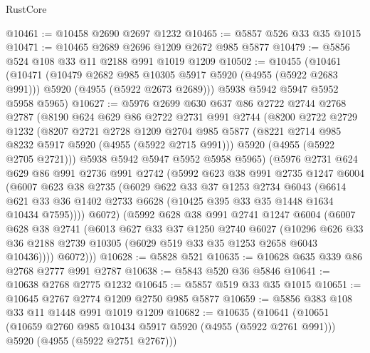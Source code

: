 \begin{lexlean}{RustCore}
\begin{coremodule}
@10461 := @10458 @2690 @2697 @1232
@10465 := @5857 @526 @33 @35 @1015
@10471 := @10465 @2689 @2696 @1209 @2672 @985 @5877
@10479 := @5856 @524 @108 @33 @11 @2188 @991 @1019 @1209
@10502 := @10455
    (@10461
      (@10471
        (@10479 @2682 @985 @10305 @5917 @5920 (@4955 (@5922 @2683 @991)))
        @5920
        (@4955 (@5922 @2673 @2689)))
      @5938
      @5942
      @5947
      @5952
      @5958
      @5965)
@10627 := @5976
    @2699
    @630
    @637
    @86
    @2722
    @2744
    @2768
    @2787
    (@8190
      @624
      @629
      @86
      @2722
      @2731
      @991
      @2744
      (@8200
        @2722
        @2729
        @1232
        (@8207
          @2721
          @2728
          @1209
          @2704
          @985
          @5877
          (@8221 @2714 @985 @8232 @5917 @5920 (@4955 (@5922 @2715 @991)))
          @5920
          (@4955 (@5922 @2705 @2721)))
        @5938
        @5942
        @5947
        @5952
        @5958
        @5965)
      (@5976
        @2731
        @624
        @629
        @86
        @991
        @2736
        @991
        @2742
        (@5992
          @623
          @38
          @991
          @2735
          @1247
          @6004
          (@6007
            @623
            @38
            @2735
            (@6029
              @622
              @33
              @37
              @1253
              @2734
              @6043
              (@6614
                @621
                @33
                @36
                @1402
                @2733
                @6628
                (@10425 @395 @33 @35 @1448 @1634 @10434 @7595))))
          @6072)
        (@5992
          @628
          @38
          @991
          @2741
          @1247
          @6004
          (@6007
            @628
            @38
            @2741
            (@6013
              @627
              @33
              @37
              @1250
              @2740
              @6027
              (@10296
                @626
                @33
                @36
                @2188
                @2739
                @10305
                (@6029 @519 @33 @35 @1253 @2658 @6043 @10436))))
          @6072)))
@10628 := @5828 @521
@10635 := @10628 @635 @339 @86 @2768 @2777 @991 @2787
@10638 := @5843 @520 @36 @5846
@10641 := @10638 @2768 @2775 @1232
@10645 := @5857 @519 @33 @35 @1015
@10651 := @10645 @2767 @2774 @1209 @2750 @985 @5877
@10659 := @5856 @383 @108 @33 @11 @1448 @991 @1019 @1209
@10682 := @10635
    (@10641
      (@10651
        (@10659 @2760 @985 @10434 @5917 @5920 (@4955 (@5922 @2761 @991)))
        @5920
        (@4955 (@5922 @2751 @2767)))

\end{coremodule}
\end{lexlean}
